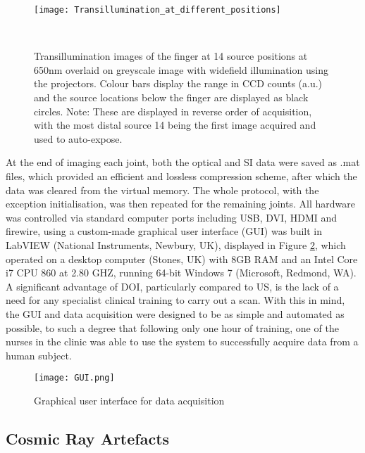 \documentclass[twoside]{bhamthesis}
\theoremstyle{definition}
\begin{document}
\begin{figure}[!ht]
\texttt{[image: Transillumination\_at\_different\_positions]}
\centering
\caption{Transillumination images of the finger at 14 source positions at 650nm overlaid on greyscale image with widefield illumination using the projectors. Colour bars display the range in CCD counts (a.u.) and the source locations below the finger are displayed as black circles. Note: These are displayed in reverse order of acquisition, with the most distal source 14 being the first image acquired and used to auto-expose.}
  \label{fig:Transillumination_at_different_positions}\
\end{figure}

At the end of imaging each joint, both the optical and SI data were saved as .mat files, which provided an efficient and lossless compression scheme, after which the data was cleared from the virtual memory. The whole protocol, with the exception initialisation, was then repeated for the remaining joints. All hardware was controlled via standard computer ports including USB, DVI, HDMI and firewire, using a custom-made graphical user interface (GUI) was built in LabVIEW (National Instruments, Newbury, UK), displayed in Figure \ref{fig:GUI}, which operated on a desktop computer (Stones, UK) with 8GB RAM and an Intel Core i7 CPU 860 at 2.80 GHZ, running 64-bit Windows 7 (Microsoft, Redmond, WA). A significant advantage of DOI, particularly compared to US, is the lack of a need for any specialist clinical training to carry out a scan. With this in mind, the GUI and data acquisition were designed to be as simple and automated as possible, to such a degree that following only one hour of training, one of the nurses in the clinic was able to use the system to successfully acquire data from a human subject.

\begin{figure}[!ht]
\centering
  \centering
  \texttt{[image: GUI.png]}
\caption{Graphical user interface for data acquisition}
  \label{fig:GUI}
\end{figure}


\subsection{Cosmic Ray Artefacts}
\end{document}
